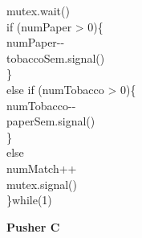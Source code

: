 {\begin{minipage}[t]{.29\linewidth}
{\begin{minipage}[t]{\linewidth}
        \hspace*{10pt}mutex.wait()\\
        \hspace*{20pt}if (numPaper > 0)\{\\
        \hspace*{30pt}numPaper-\--\\
        \hspace*{30pt}tobaccoSem.signal()\\
        \hspace*{20pt}\}\\
        \hspace*{20pt}else if (numTobacco > 0)\{\\
        \hspace*{30pt}numTobacco-\--\\
        \hspace*{30pt}paperSem.signal()\\
        \hspace*{20pt}\}\\
        \hspace*{20pt}else\\
        \hspace*{30pt}numMatch++\\
        \hspace*{10pt}mutex.signal()\\
    \}while(1)
    \end{minipage}
    }
\end{minipage}
\hfill
\begin{minipage}[t]{.29\linewidth}
    \begin{center}
        {\bfseries Pusher C}
    \end{center}
\end{minipage}}
